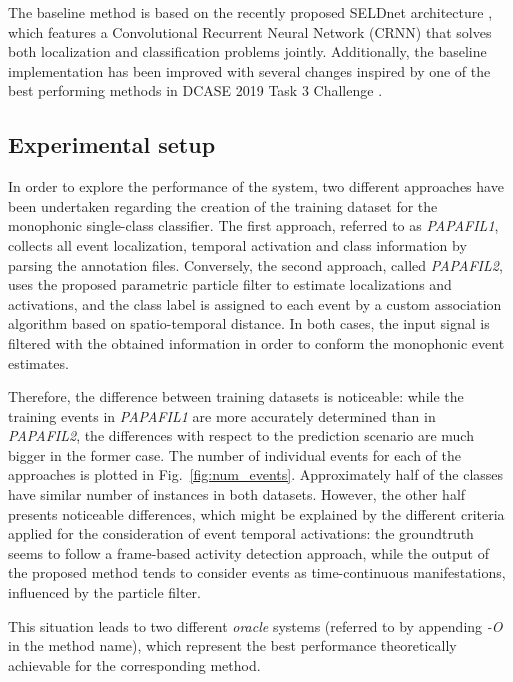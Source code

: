 The baseline method is based on the recently proposed SELDnet architecture  \cite{Adavanne2018_JSTSP}, which features a Convolutional Recurrent Neural Network (CRNN) that solves both localization and classification problems jointly. 
Additionally, the baseline implementation has been improved with several changes inspired by one of the best performing methods in DCASE 2019 Task 3 Challenge \cite{Cao2019}. 

\subsection{Experimental setup}


In order to explore the performance of the system, two different approaches have been undertaken regarding the creation of the training dataset for the monophonic single-class classifier. 
The first approach, referred to as \textit{PAPAFIL1}, collects all event localization, temporal activation and class information by parsing the annotation files.
Conversely, the second approach, called \textit{PAPAFIL2}, uses the proposed parametric particle filter to estimate localizations and activations, and the class label is assigned to each event by a custom association algorithm based on spatio-temporal distance. 
In both cases, the input signal is filtered with the obtained information in order to conform the monophonic event estimates.

Therefore, the difference between training datasets is noticeable: while the training events in \textit{PAPAFIL1} are more accurately determined than in \textit{PAPAFIL2}, the differences with respect to the prediction scenario are much bigger in the former case. 
The number of individual events for each of the approaches is plotted in Fig.~\ref{fig:num_events}. Approximately half of the classes have similar number of instances in both datasets. However, the other half presents noticeable differences, which might be explained by the different criteria applied for the consideration of event temporal activations: the groundtruth seems to follow a frame-based activity detection approach, while the output of the proposed method tends to consider events as time-continuous manifestations, influenced by the particle filter.

This situation leads to two different \textit{oracle} systems (referred to by appending \textit{-O} in the method name), which represent the best performance theoretically achievable for the corresponding method. 

